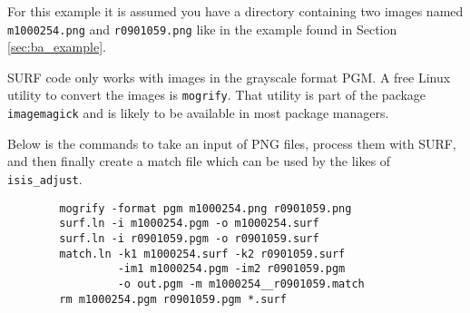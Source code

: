 For this example it is assumed you have a directory containing two
images named \verb=m1000254.png= and \verb=r0901059.png= like in the
example found in Section \ref{sec:ba_example}.

SURF code only works with images in the grayscale format PGM. A free
Linux utility to convert the images is \texttt{mogrify}. That utility
is part of the package \texttt{imagemagick} and is likely to be
available in most package managers.

Below is the commands to take an input of PNG files, process them with
SURF, and then finally create a match file which can be used by the
likes of \texttt{isis\_adjust}.

\begin{verbatim}
        mogrify -format pgm m1000254.png r0901059.png
        surf.ln -i m1000254.pgm -o m1000254.surf
        surf.ln -i r0901059.pgm -o r0901059.surf
        match.ln -k1 m1000254.surf -k2 r0901059.surf
                 -im1 m1000254.pgm -im2 r0901059.pgm
                 -o out.pgm -m m1000254__r0901059.match
        rm m1000254.pgm r0901059.pgm *.surf
\end{verbatim}

\begin{center}
\end{center}







